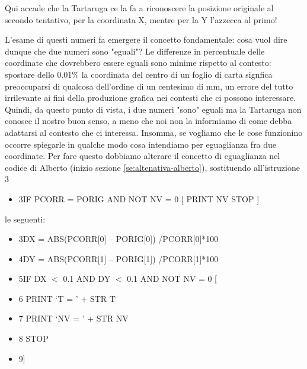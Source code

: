 Qui accade che la Tartaruga ce la fa a riconoscere la posizione originale al 
secondo tentativo, per la coordinata X, mentre per la Y l'azzecca al primo! 

L'esame di questi numeri fa emergere il concetto fondamentale: cosa vuol dire
dunque che due numeri sono "eguali"? Le differenze in percentuale delle
coordinate che dovrebbero essere eguali sono minime rispetto al contesto:
spostare dello 0.01\% la coordinata del centro di un foglio di carta signfica
preoccuparsi di qualcosa dell'ordine di un centesimo di mm, un errore del tutto
irrilevante ai fini della produzione grafica nei contesti che ci possono
interessare. Quindi, da questo punto di vista, i due numeri "sono" eguali ma la
Tartaruga non conosce il nostro buon senso, a meno che noi non la informiamo di
come debba adattarsi al contesto che ci interessa. Insomma, se vogliamo che le
cose funzionino occorre spiegarle in qualche modo cosa intendiamo per
eguaglianza fra due coordinate. Per fare questo dobbiamo alterare il concetto
di eguaglianza nel codice di Alberto (inizio sezione \ref{se:altenativa-alberto}), 
sostituendo all'istruzione 3

\vskip 1cm

\begin{minipage}{1.0\textwidth}
\begin{itemize}[itemsep=-3pt,parsep=2pt]
\item[] 3\hspace{8pt}\hspace{8pt}IF PCORR = PORIG  AND NOT NV = 0 [ PRINT NV STOP ]   
\end{itemize}          	          
\end{minipage}

\vskip 1cm

le seguenti:

\vskip 1cm

\begin{minipage}{1.0\textwidth}
\begin{itemize}[itemsep=-3pt,parsep=2pt]
\item[] 3\hspace{8pt}DX = ABS(PCORR[0] – PORIG[0]) /PCORR[0]*100
\item[] 4\hspace{8pt}DY = ABS(PCORR[1] – PORIG[1]) /PCORR[1]*100
\item[] 5\hspace{8pt}IF DX $<$ 0.1 AND DY $<$ 0.1  AND NOT NV = 0 [
\item[] 6\hspace{8pt}\hspace{8pt}    PRINT ‘T = ’ + STR T
\item[] 7\hspace{8pt}\hspace{8pt}    PRINT ‘NV = ’ + STR NV  
\item[] 8\hspace{8pt}\hspace{8pt}    STOP
\item[] 9\hspace{8pt}] 
\end{itemize}          	          
\end{minipage}

